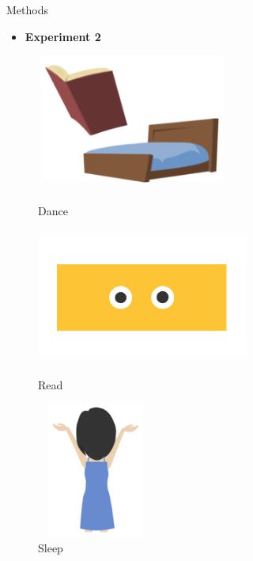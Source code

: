\documentclass[final]{beamer}
\newlength{\colwidth}
\begin{document}
\begin{frame}[t]
\begin{columns}[t]
\begin{column}{\colwidth}
\begin{block}{Methods}
    \vspace{-0.3in}

    \begin{itemize}
      \item \textbf{Experiment 2}
    \end{itemize}
    \begin{figure}
      \begin{minipage}[t]{0.2\linewidth}
        \centering
        \includegraphics[width=2.5in, height=1.75in]{figures/fraw.png}
        \caption{Dance}
      \end{minipage}
      \begin{minipage}[t]{0.2\linewidth}
        \centering
        \includegraphics[width=2.75in, height=1.75in]{figures/gobb.png}
        \caption{Read}
      \end{minipage}%
      \begin{minipage}[t]{0.2\linewidth}
        \centering
        \includegraphics[width=1.5in, height=1.75in]{figures/plip.png}
        \caption{Sleep}
      \end{minipage}
      \begin{minipage}[t]{0.2\linewidth}
        \centering

\end{minipage}
\end{figure}
\end{block}
\end{column}
\end{columns}
\end{frame}
\end{document}
